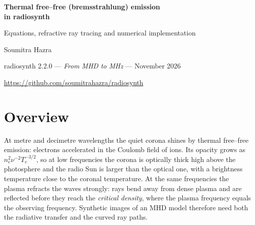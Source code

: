 \documentclass[11pt,a4paper]{article}
\begin{document}
\begin{center}
{\LARGE\bfseries\color{accent} Thermal free--free (bremsstrahlung) emission\\[3pt] in \textsf{radiosynth}\par}
\vspace{0.3cm}
{\large Equations, refractive ray tracing and numerical implementation\par}
\vspace{0.4cm}
{\normalsize Soumitra Hazra\par}
\vspace{0.1cm}
{\small \textsf{radiosynth} 2.2.0 --- \emph{From MHD to MHz} --- November 2026\par}
{\small \url{https://github.com/soumitrahazra/radiosynth}\par}
\end{center}

\begin{abstract}
\noindent This note collects every equation used by \textsf{radiosynth} to compute the thermal
free--free (bremsstrahlung) radio emission of an MHD model of a solar or stellar corona. It
gives the emission and absorption coefficients (constant Gaunt factor or Coulomb logarithm),
the refraction of radio waves in the plasma and the ray equation, the image geometry for an
observer at Earth or at a stellar distance, and the step-by-step numerical integration of the
curved rays: predictor, step control by curvature and by distance to the critical surface,
Boris rotation, parabolic reflection and the recovery of rays that overshoot the critical
surface. It then describes the optically thin and the full radiative transfer, the conversion
to brightness temperature and flux, the comparison with straight lines of sight, the
spherically symmetric (1D) models and the analytic stellar-wind solution used for validation.
Each section names the functions that implement it, so that the equations can be checked
line by line against the code.
\end{abstract}

\tableofcontents

\section{Overview}

At metre and decimetre wavelengths the quiet corona shines by thermal free--free emission:
electrons accelerated in the Coulomb field of ions. Its opacity grows as $n_e^2\nu^{-2}T_e^{-3/2}$,
so at low frequencies the corona is optically thick high above the photosphere and the radio
Sun is larger than the optical one, with a brightness temperature close to the coronal
temperature. At the same frequencies the plasma refracts the waves strongly: rays bend away
from dense plasma and are reflected before they reach the \emph{critical density}, where the
plasma frequency equals the observing frequency. Synthetic images of an MHD model therefore
need both the radiative transfer and the curved ray paths.
\end{document}
